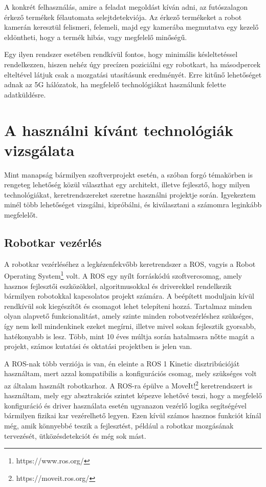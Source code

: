 \documentclass[11pt,a4paper,oneside]{article}
\begin{document}
A konkrét felhasználás, amire a feladat megoldást kíván adni, az futószalagon érkező termékek félautomata selejtdetekviója. Az érkező termékeket a robot kamerán keresztül felismeri, felemeli, majd egy kamerába megmutatva egy kezelő eldöntheti, hogy a termék hibás, vagy megfelelő minőségű.

Egy ilyen rendszer esetében rendkívül fontos, hogy minimális késleltetéssel rendelkezzen, hiszen nehéz úgy precízen poziciálni egy robotkart, ha másodpercek elteltével látjuk csak a mozgatási utasításunk eredményét. Erre kitűnő lehetőséget adnak az 5G hálózatok, ha megfelelő technológiákat használunk felette adatküldésre.

\newpage

\section{A használni kívánt technológiák vizsgálata}

Mint manapság bármilyen szoftverprojekt esetén, a szóban forgó témakörben is rengeteg lehetőség közül választhat egy architekt, illetve fejlesztő, hogy milyen technológiákat, keretrendszereket szeretne használni projektje során. Igyekeztem minél több lehetőséget vizsgálni, kipróbálni, és kiválasztani a számomra leginkább megfelelőt.

\subsection{Robotkar vezérlés}

A robotkar vezérléséhez a legkézenfekvőbb keretrendszer a ROS, vagyis a Robot Operating System\footnote{https://www.ros.org/} volt. A ROS egy nyílt forráskódú szoftvercsomag, amely hasznos fejlesztői eszközökkel, algoritmusokkal és driverekkel rendelkezik bármilyen robotokkal kapcsolatos projekt számára. A beépített moduljain kívül rendkívül sok kiegészítőt és csomagot lehet telepíteni hozzá. Tartalmaz minden olyan alapvető funkcionalitást, amely szinte minden robotvezérléshez szükséges, így nem kell mindenkinek ezeket megírni, illetve mivel sokan fejlesztik gyorsabb, hatékonyabb is lesz. Több, mint 10 éves múltja során hatalmasra nőtte magát a projekt, számos kutatási és oktatási projektben is jelen van.

A ROS-nak több verziója is van, én eleinte a ROS 1 Kinetic disztribúcióját használtam, mert azzal kompatibilis a konfigurációs csomag, mely szükséges volt az általam használt robotkarhoz. A ROS-ra épülve a MoveIt!\footnote{https://moveit.ros.org/} keretrendszert is használtam, mely egy absztrakciós szintet képezve lehetővé teszi, hogy a megfelelő konfiguráció és driver használata esetén ugyanazon vezérlő logika segítségével bármilyen fizikai kar vezérelhető legyen. Ezen kívül számos hasznos funkciót kínál még, amik könnyebbé teszik a fejlesztést, például a robotkar mozgásának tervezését, ütközésdetekciót és még sok mást.
\end{document}
